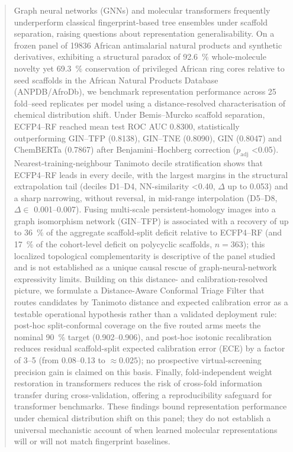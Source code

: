 \documentclass[11pt,a4paper]{article}
\begin{document}
\begin{abstract}
Graph neural networks (GNNs) and molecular transformers frequently underperform classical fingerprint-based tree ensembles under scaffold separation, raising questions about representation generalisability. On a frozen panel of \num{19836} African antimalarial natural products and synthetic derivatives, exhibiting a structural paradox of \qty{92.6}{\percent} whole-molecule novelty yet \qty{69.3}{\percent} conservation of privileged African ring cores relative to seed scaffolds in the African Natural Products Database (ANPDB/AfroDb), we benchmark representation performance across \num{25} fold--seed replicates per model using a distance-resolved characterisation of chemical distribution shift. Under Bemis--Murcko scaffold separation, ECFP4--RF reached mean test ROC AUC \num{0.8300}, statistically outperforming GIN--TFP (\num{0.8138}), GIN--TNE (\num{0.8090}), GIN (\num{0.8047}) and ChemBERTa (\num{0.7867}) after Benjamini--Hochberg correction ($p_{\text{adj}}$ \num{<0.05}). Nearest-training-neighbour Tanimoto decile stratification shows that ECFP4--RF leads in every decile, with the largest margins in the structural extrapolation tail (deciles D1--D4, NN-similarity \num{<0.40}, $\Delta$ up to \num{0.053}) and a sharp narrowing, without reversal, in mid-range interpolation (D5--D8, $\Delta \in$ \numrange{0.001}{0.007}). Fusing multi-scale persistent-homology images into a graph isomorphism network (GIN--TFP) is associated with a recovery of up to \qty{36}{\percent} of the aggregate scaffold-split deficit relative to ECFP4--RF (and \qty{17}{\percent} of the cohort-level deficit on polycyclic scaffolds, $n=\num{363}$); this localized topological complementarity is descriptive of the panel studied and is not established as a unique causal rescue of graph-neural-network expressivity limits. Building on this distance- and calibration-resolved picture, we formulate a Distance-Aware Conformal Triage Filter that routes candidates by Tanimoto distance and expected calibration error as a testable operational hypothesis rather than a validated deployment rule: post-hoc split-conformal coverage on the five routed arms meets the nominal \qty{90}{\percent} target (\numrange{0.902}{0.906}), and post-hoc isotonic recalibration reduces residual scaffold-split expected calibration error (ECE) by a factor of \numrange{3}{5} (from \numrange{0.08}{0.13} to $\approx\num{0.025}$); no prospective virtual-screening precision gain is claimed on this basis. Finally, fold-independent weight restoration in transformers reduces the risk of cross-fold information transfer during cross-validation, offering a reproducibility safeguard for transformer benchmarks. These findings bound representation performance under chemical distribution shift on this panel; they do not establish a universal mechanistic account of when learned molecular representations will or will not match fingerprint baselines.
\end{abstract}
\end{document}
